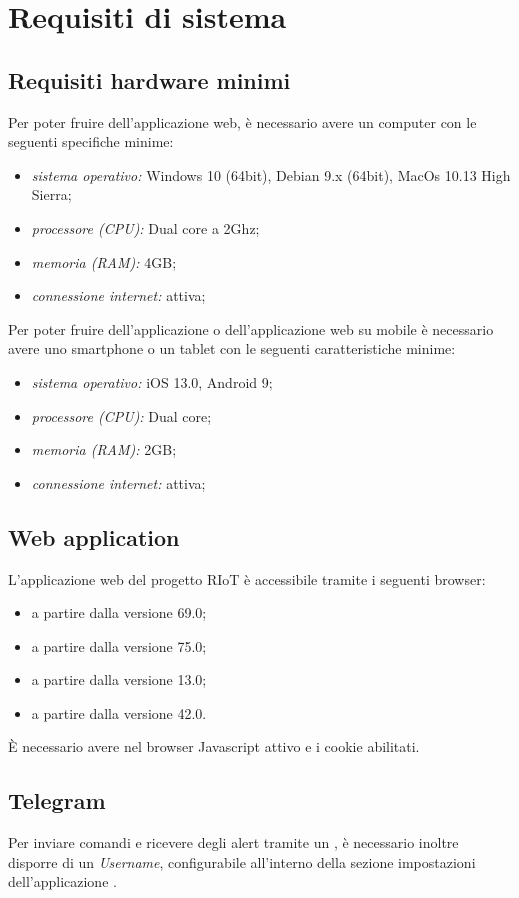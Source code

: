 \section{Requisiti di sistema}

	\subsection{Requisiti hardware minimi}
	Per poter fruire dell'applicazione web, è necessario avere un computer con le seguenti specifiche minime:
	\begin{itemize}
	 	\item \textit{sistema operativo:} Windows 10 (64bit), Debian 9.x (64bit), MacOs 10.13 High Sierra;
	 	\item \textit{processore (CPU):} Dual core a 2Ghz;
	 	\item \textit{memoria (RAM):} 4GB;
	 	\item \textit{connessione internet:} attiva; 
	\end{itemize} 
	Per poter fruire dell'applicazione  o dell'applicazione web su mobile è necessario avere uno smartphone o un tablet con le seguenti caratteristiche minime:
	\begin{itemize}
	 	\item \textit{sistema operativo:} iOS 13.0, Android 9;
	 	\item \textit{processore (CPU):} Dual core;
	 	\item \textit{memoria (RAM):} 2GB;
	 	\item \textit{connessione internet:} attiva; 
	\end{itemize} 

	\subsection{Web application}
	L'applicazione web del progetto RIoT è accessibile tramite i seguenti browser:
	\begin{itemize}
	 	\item {} a partire dalla versione 69.0;
	 	\item {} a partire dalla versione 75.0;
	 	\item {} a partire dalla versione 13.0;
	 	\item {} a partire dalla versione 42.0.
	\end{itemize} 
	È necessario avere nel browser Javascript attivo e i cookie abilitati.

	\subsection{Telegram}
	Per inviare comandi e ricevere degli alert tramite un , è necessario inoltre disporre di un \textit{Username}, configurabile all'interno della sezione impostazioni dell'applicazione .
